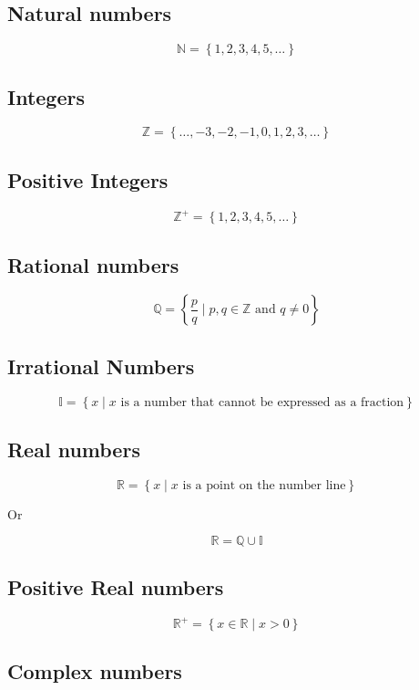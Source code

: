 \documentclass[12pt letter]{report}
\begin{document}
\subsection{Natural numbers}

\[
  \mathbb{N} = \left\{ 1, 2, 3, 4, 5, \ldots \right\}
\]

\subsection{Integers}

\[
  \mathbb{Z} = \left\{ \ldots, -3, -2, -1, 0, 1, 2, 3, \ldots \right\}
\]

\subsection{Positive Integers}

\[
  \mathbb{Z}^{+} = \left\{ 1, 2, 3, 4, 5, \ldots \right\}
\]

\subsection{Rational numbers}

\[
  \mathbb{Q} = \left\{ \frac{p}{q} \mid p, q \in \mathbb{Z} \text{ and } q \neq 0 \right\}
\]

\subsection{Irrational Numbers}
\[
  \mathbb{I} = \left\{ x \mid x \text{ is a number that cannot be expressed as a fraction} \right\}
\]

\subsection{Real numbers}

\[
  \mathbb{R} = \left\{ x \mid x \text{ is a point on the number line} \right\}
\]

Or

\[
  \mathbb{R} = \mathbb{Q} \cup \mathbb{I}
\]

\subsection{Positive Real numbers}
\[
  \mathbb{R}^{+} = \left\{ x \in \mathbb{R} \mid x > 0 \right\}
\]

\subsection{Complex numbers}
\end{document}
